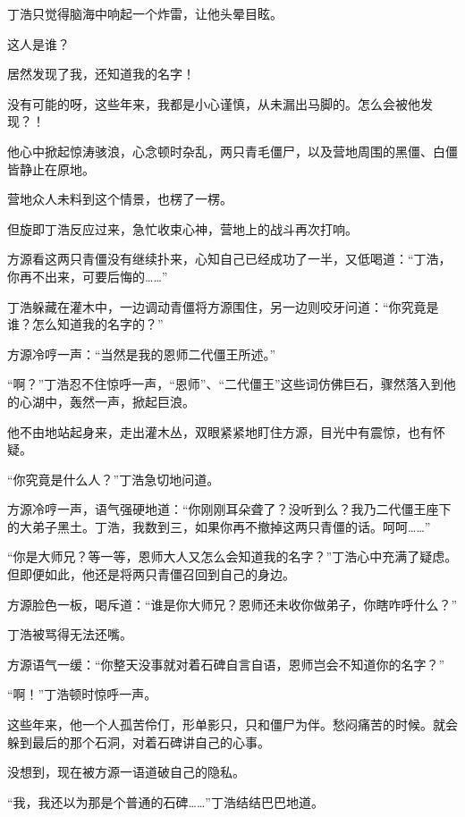 
\begin{this_body}



丁浩只觉得脑海中响起一个炸雷，让他头晕目眩。

这人是谁？

居然发现了我，还知道我的名字！

没有可能的呀，这些年来，我都是小心谨慎，从未漏出马脚的。怎么会被他发现？！

他心中掀起惊涛骇浪，心念顿时杂乱，两只青毛僵尸，以及营地周围的黑僵、白僵皆静止在原地。

营地众人未料到这个情景，也楞了一楞。

但旋即丁浩反应过来，急忙收束心神，营地上的战斗再次打响。

方源看这两只青僵没有继续扑来，心知自己已经成功了一半，又低喝道：“丁浩，你再不出来，可要后悔的……”

丁浩躲藏在灌木中，一边调动青僵将方源围住，另一边则咬牙问道：“你究竟是谁？怎么知道我的名字的？”

方源冷哼一声：“当然是我的恩师二代僵王所述。”

“啊？”丁浩忍不住惊呼一声，“恩师”、“二代僵王”这些词仿佛巨石，骤然落入到他的心湖中，轰然一声，掀起巨浪。

他不由地站起身来，走出灌木丛，双眼紧紧地盯住方源，目光中有震惊，也有怀疑。

“你究竟是什么人？”丁浩急切地问道。

方源冷哼一声，语气强硬地道：“你刚刚耳朵聋了？没听到么？我乃二代僵王座下的大弟子黑土。丁浩，我数到三，如果你再不撤掉这两只青僵的话。呵呵……”

“你是大师兄？等一等，恩师大人又怎么会知道我的名字？”丁浩心中充满了疑虑。但即便如此，他还是将两只青僵召回到自己的身边。

方源脸色一板，喝斥道：“谁是你大师兄？恩师还未收你做弟子，你瞎咋呼什么？”

丁浩被骂得无法还嘴。

方源语气一缓：“你整天没事就对着石碑自言自语，恩师岂会不知道你的名字？”

“啊！”丁浩顿时惊呼一声。

这些年来，他一个人孤苦伶仃，形单影只，只和僵尸为伴。愁闷痛苦的时候。就会躲到最后的那个石洞，对着石碑讲自己的心事。

没想到，现在被方源一语道破自己的隐私。

“我，我还以为那是个普通的石碑……”丁浩结结巴巴地道。


\end{this_body}
